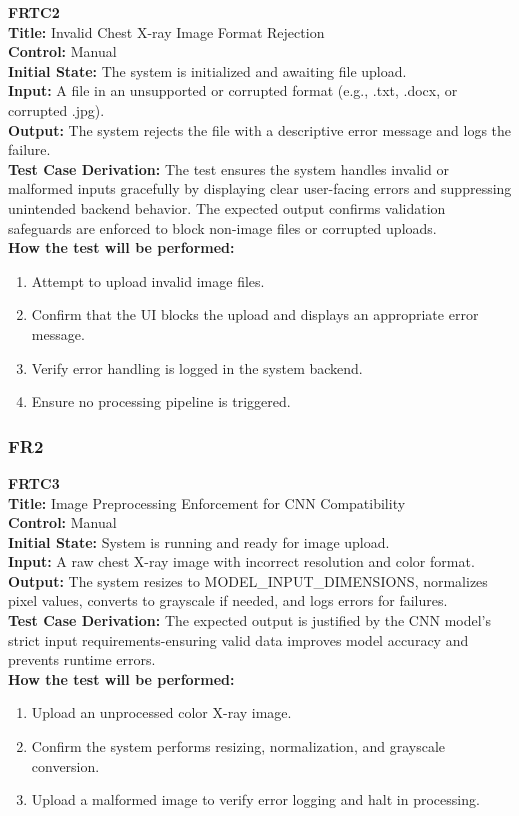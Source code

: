 \documentclass[12pt, titlepage]{article}
\begin{document}
\textbf{FRTC2}\\
\textbf{Title:} Invalid Chest X-ray Image Format Rejection\\
\textbf{Control:} Manual\\
\textbf{Initial State:} The system is initialized and awaiting file upload.\\
\textbf{Input:} A file in an unsupported or corrupted format (e.g., .txt, .docx, or corrupted .jpg).\\
\textbf{Output:} The system rejects the file with a descriptive error message and logs the failure.\\
\textbf{Test Case Derivation:} The test ensures the system handles invalid or malformed inputs gracefully by displaying clear user-facing errors and suppressing unintended backend behavior. The expected output confirms validation safeguards are enforced to block non-image files or corrupted uploads.\\
\textbf{How the test will be performed:}
\begin{enumerate}
  \item Attempt to upload invalid image files.
  \item Confirm that the UI blocks the upload and displays an appropriate error message.
  \item Verify error handling is logged in the system backend.
  \item Ensure no processing pipeline is triggered.
\end{enumerate}

\vspace{1em}


\subsubsection{FR2}

\textbf{FRTC3}\\
\textbf{Title:} Image Preprocessing Enforcement for CNN Compatibility\\
\textbf{Control:} Manual\\
\textbf{Initial State:} System is running and ready for image upload.\\
\textbf{Input:} A raw chest X-ray image with incorrect resolution and color format.\\
\textbf{Output:} The system resizes to MODEL\_INPUT\_DIMENSIONS, normalizes pixel values, converts to grayscale if needed, and logs errors for failures.\\
\textbf{Test Case Derivation:} The expected output is justified by the CNN model's strict input requirements-ensuring valid data improves model accuracy and prevents runtime errors.\\
\textbf{How the test will be performed:}
\begin{enumerate}
  \item Upload an unprocessed color X-ray image.
  \item Confirm the system performs resizing, normalization, and grayscale conversion.
  \item Upload a malformed image to verify error logging and halt in processing.
\end{enumerate}
\end{document}
